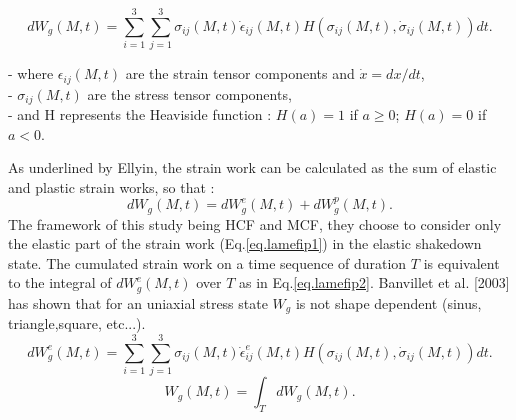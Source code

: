 \documentclass[3p,times,procedia,number]{elsarticle}
\begin{document}
$$dW_g(M,t)=\sum_{i=1}^{3}\sum_{j=1}^{3}\sigma_{ij}\left( M,t\right)\dot{\epsilon}_{ij}\left( M,t\right)H\left( \sigma_{ij}\left( M,t\right),\dot{\sigma}_{ij}\left( M,t\right)\right)dt .$$

\noindent
- where $\epsilon_{ij}\left( M,t\right)$ are the strain tensor components and $\dot{x}= dx/dt$,\\
- $\sigma_{ij}\left( M,t\right)$ are the stress tensor components,\\
- and H represents the Heaviside function : $H(a) = 1$ if $a \geqslant 0$; $H(a) = 0$ if $a < 0$.

As underlined by Ellyin\cite{ellyin2012fatigue}, the strain work can be calculated as the sum of elastic and plastic strain works, so that :
$$dW_g(M,t)=dW_g^e(M,t)+dW_g^p(M,t).$$
The framework of this study being HCF and MCF, they choose to consider only the elastic part of the strain work (Eq.\eqref{eq.lamefip1}) in the elastic shakedown state. The cumulated strain work on a time
sequence of duration $T$ is equivalent to the integral of $dW_g^e(M,t)$ over $T$ as in Eq.\eqref{eq.lamefip2}. Banvillet et al. [2003]\cite{banvillet2003volumetric} has shown that for an uniaxial stress state $W_g$ is not shape dependent (sinus, triangle,square, etc...).
\begin{equation}
dW_g^e(M,t)=\sum_{i=1}^{3}\sum_{j=1}^{3}\sigma_{ij}\left( M,t\right)\dot{\epsilon}_{ij}^e\left( M,t\right)H\left( \sigma_{ij}\left( M,t\right),\dot{\sigma}_{ij}\left( M,t\right)\right)dt .
\label{eq.lamefip1}
\end{equation}
\begin{equation}W_g(M,t)=\int_{T}dW_g(M,t).\label{eq.lamefip2}
\end{equation}
\end{document}
